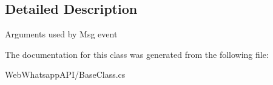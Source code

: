 \subsection{Detailed Description}
Arguments used by Msg event 



The documentation for this class was generated from the following file\+:\begin{DoxyCompactItemize}
\item 
Web\+Whatsapp\+A\+P\+I/Base\+Class.\+cs\end{DoxyCompactItemize}
